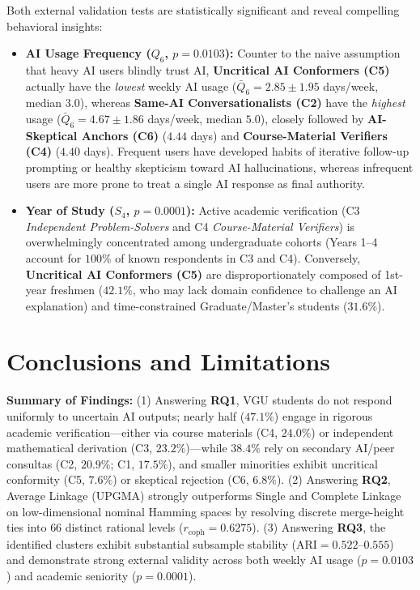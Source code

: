 \documentclass[11pt,a4paper]{article}
\begin{document}
Both external validation tests are statistically significant and reveal compelling behavioral insights:
\begin{itemize}
    \item \textbf{AI Usage Frequency ($Q_6$, $p = 0.0103$):} Counter to the naive assumption that heavy AI users blindly trust AI, \textbf{Uncritical AI Conformers (C5)} actually have the \textit{lowest} weekly AI usage ($\bar{Q}_6 = 2.85 \pm 1.95$ days/week, median $3.0$), whereas \textbf{Same-AI Conversationalists (C2)} have the \textit{highest} usage ($\bar{Q}_6 = 4.67 \pm 1.86$ days/week, median $5.0$), closely followed by \textbf{AI-Skeptical Anchors (C6)} ($4.44$ days) and \textbf{Course-Material Verifiers (C4)} ($4.40$ days). Frequent users have developed habits of iterative follow-up prompting or healthy skepticism toward AI hallucinations, whereas infrequent users are more prone to treat a single AI response as final authority.
    \item \textbf{Year of Study ($S_4$, $p = 0.0001$):} Active academic verification (C3 \textit{Independent Problem-Solvers} and C4 \textit{Course-Material Verifiers}) is overwhelmingly concentrated among undergraduate cohorts (Years 1--4 account for $100\%$ of known respondents in C3 and C4). Conversely, \textbf{Uncritical AI Conformers (C5)} are disproportionately composed of 1st-year freshmen ($42.1\%$, who may lack domain confidence to challenge an AI explanation) and time-constrained Graduate/Master's students ($31.6\%$).
\end{itemize}

\section{Conclusions and Limitations}

\textbf{Summary of Findings:} (1) Answering \textbf{RQ1}, VGU students do not respond uniformly to uncertain AI outputs; nearly half ($47.1\%$) engage in rigorous academic verification---either via course materials (C4, $24.0\%$) or independent mathematical derivation (C3, $23.2\%$)---while $38.4\%$ rely on secondary AI/peer consultas (C2, $20.9\%$; C1, $17.5\%$), and smaller minorities exhibit uncritical conformity (C5, $7.6\%$) or skeptical rejection (C6, $6.8\%$). (2) Answering \textbf{RQ2}, Average Linkage (UPGMA) strongly outperforms Single and Complete Linkage on low-dimensional nominal Hamming spaces by resolving discrete merge-height ties into $66$ distinct rational levels ($r_{\text{coph}} = 0.6275$). (3) Answering \textbf{RQ3}, the identified clusters exhibit substantial subsample stability ($\text{ARI} = 0.522$--$0.555$) and demonstrate strong external validity across both weekly AI usage ($p = 0.0103$) and academic seniority ($p = 0.0001$).
\end{document}
